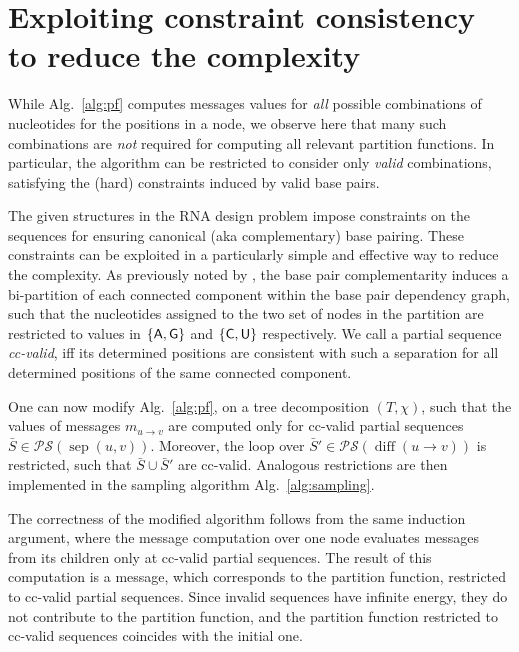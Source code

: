 \documentclass[10pt]{article}
\newcommand{\val}{\bar S} %
\newcommand{\separator}[2]{\operatorname{sep}(#1,#2)}
\newcommand{\difference}[2]{\operatorname{diff}(#1 \rightarrow #2)}
\newcommand{\Message}[2]{m_{#1\rightarrow #2}}
\newcommand{\partseqs}{\mathcal{P\!S}}
\newcommand{\Def}[1]{\emph{#1}}
\newcommand{\Nuc}[1]{{\sf #1}}
\newcommand{\Ab}{\Nuc{A}}
\newcommand{\Cb}{\Nuc{C}}
\newcommand{\Gb}{\Nuc{G}}
\newcommand{\Ub}{\Nuc{U}}
\newcommand{\substitute}[2]{#1\cup#2}
\newcommand{\citet}[1]{\cite{#1}}
\begin{document}
    \section{Exploiting constraint consistency to reduce the complexity}\label{sec:improvedComplexity}

    While Alg.~\ref{alg:pf} computes messages values for
    \emph{all} possible combinations of nucleotides for the positions
    in a node,
    we observe here that many such combinations are \emph{not} required for computing all relevant
    partition functions. In particular, the algorithm can be restricted to
    consider only \Def{valid} combinations, satisfying the (hard)
    constraints induced by valid base pairs.

    The given structures in the RNA design problem impose constraints on
    the sequences for ensuring canonical (aka complementary)
    base pairing. These constraints can be exploited in a particularly
    simple and effective way to reduce the complexity.  As previously
    noted by \citet{Flamm2001}, the base pair complementarity induces a
    bi-partition of each connected component within the base pair
    dependency graph, such that the nucleotides assigned to the two set of
    nodes in the partition are restricted to values in $\{\Ab,\Gb\}$ and
    $\{\Cb,\Ub\}$ respectively. We call a partial sequence \Def{cc-valid},
    iff its determined positions are consistent with such a separation for
    all determined positions of the same connected component.


    One can now modify Alg.~\ref{alg:pf}, on a tree decomposition
    $(T,\chi)$, such that the values of messages
    $\Message{u}{v}$ are computed only for cc-valid
    partial sequences $\val\in\partseqs(\separator{u}{v})$. Moreover, the
    loop over $\val'\in\partseqs(\difference{u}{v})$ is restricted, such
    that $\substitute{\val}{\val'}$ are cc-valid. Analogous restrictions are
    then implemented in the sampling algorithm Alg.~\ref{alg:sampling}.

    The correctness of the modified algorithm follows from the same
    induction argument, where the message computation over one node
    evaluates messages from its children only at cc-valid partial
    sequences. The result of this computation is a message, which corresponds
    to the partition function, restricted to cc-valid partial sequences.
    Since invalid sequences have infinite energy, they do not contribute to
    the partition function, and the partition function restricted to cc-valid sequences coincides
    with the initial one.
\end{document}
